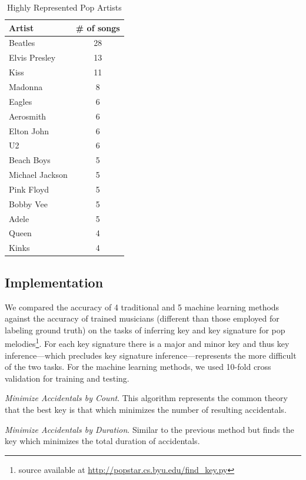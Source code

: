 \documentclass[letterpaper]{article}
\begin{document}
\begin{table}[]
\centering
\caption{Highly Represented Pop Artists}
\label{tab:data_summary}
\begin{tabular}{@{}lc@{}}
\toprule
Artist & \# of songs\\ \midrule
Beatles	& 28 \\
Elvis Presley	& 13 \\
Kiss	&	11 \\
Madonna	&	8 \\
Eagles	&	6 \\
Aerosmith	&	6 \\
Elton John	&	6 \\
U2	&	6 \\
Beach Boys	&	5 \\
Michael Jackson	&	5 \\
Pink Floyd	&	5 \\
Bobby Vee		&	5 \\
Adele	&	5 \\
Queen	&	4 \\
Kinks		&	4 \\
\end{tabular}
\end{table}

\subsection{Implementation}

We compared the accuracy of 4 traditional and 5 machine learning methods against the accuracy of trained musicians (different than those employed for labeling ground truth) on the tasks of inferring key and key signature for pop melodies\footnote{source available at \url{http://popstar.cs.byu.edu/find_key.py}}. For each key signature there is a major and minor key and thus key inference---which precludes key signature inference---represents the more difficult of the two tasks. For the machine learning methods, we used 10-fold cross validation for training and testing.

\emph{Minimize Accidentals by Count}. This algorithm represents the common theory that the best key is that which minimizes the number of resulting accidentals.

\emph{Minimize Accidentals by Duration}. Similar to the previous method but finds the key which minimizes the total duration of accidentals.
\end{document}
